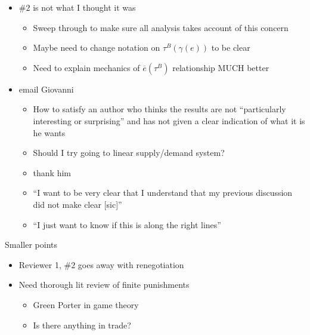 \documentclass[12pt]{article}
\newcommand{\ov}{\overline}
\newcommand{\ga}{\gamma}
\begin{document}
\begin{itemize}
	\item $\#2$ is not what I thought it was
		\begin{itemize}
			\item Sweep through to make sure all analysis takes account of this concern
			\item Maybe need to change notation on $\tau^B(\ga(e))$ to be clear
			\item Need to explain mechanics of $\ov{e}(\tau^B)$ relationship MUCH better
		\end{itemize}
	
	\item email Giovanni
		\begin{itemize}
			\item How to satisfy an author who thinks the results are not ``particularly interesting or surprising'' and has not given a clear indication of what it is he wants
			\item Should I try going to linear supply/demand system?
			\item thank him
			\item ``I want to be very clear that I understand that my previous discussion did not make clear [sic]''
			\item ``I just want to know if this is along the right lines''
		\end{itemize}
\end{itemize}

\vskip1in
Smaller points
\begin{itemize}
	\item Reviewer 1, $\#2$ goes away with renegotiation
	\item Need thorough lit review of finite punishments
		\begin{itemize}
			\item Green Porter in game theory
			\item Is there anything in trade?
		\end{itemize}
\end{itemize}
\end{document}
